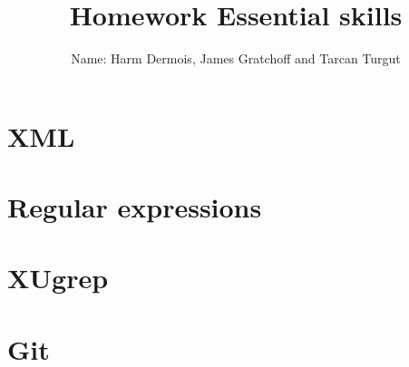 \documentclass[12pt,a4paper]{article}
\begin{document}
\title{Homework Essential skills}
\author{Name: Harm Dermois, James Gratchoff and Tarcan Turgut }
\date{}
\maketitle

\section{XML}

\section{Regular expressions}
\section{XUgrep}
\section{Git}
\end{document}
